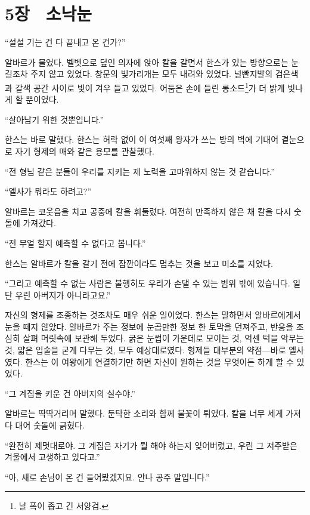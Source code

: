 

\chapter[5장  소낙눈][5장\hspace*{.5em}소낙눈]{5장 \ 소낙눈}



\forceindent``설설 기는 건 다 끝내고 온 건가?''

알바르가 물었다. 벨벳으로 덮인 의자에 앉아 칼을 갈면서 한스가 있는 방향으로는 눈길조차 주지 않고 있었다. 창문의 빛가리개는 모두 내려와 있었다. 널빤지발의 검은색과 갈색 공간 사이로 빛이 겨우 들고 있었다. 어둠은 손에 들린 롱소드\footnote{날 폭이 좁고 긴 서양검.}가 더 밝게 빛나게 할 뿐이었다.

``살아남기 위한 것뿐입니다.''

한스는 바로 말했다. 한스는 허락 없이 이 여섯째 왕자가 쓰는 방의 벽에 기대어 곁눈으로 자기 형제의 매와 같은 용모를 관찰했다.

``전 형님 같은 분들이 우리를 지키는 제 노력을 고마워하지 않는 것 같습니다.''

``엘사가 뭐라도 하려고?''

알바르는 코웃음을 치고 공중에 칼을 휘둘렀다. 여전히 만족하지 않은 채 칼을 다시 숫돌에 가져갔다.

``전 무얼 할지 예측할 수 없다고 봅니다.''

한스는 알바르가 칼을 갈기 전에 잠깐이라도 멈추는 것을 보고 미소를 지었다.

``그리고 예측할 수 없는 사람은 불행히도 우리가 손댈 수 있는 범위 밖에 있습니다. 일단 우린 아버지가 아니라고요.''

자신의 형제를 조종하는 것조차도 매우 쉬운 일이었다. 한스는 말하면서 알바르에게서 눈을 떼지 않았다. 알바르가 주는 정보에 눈곱만한 정보 한 토막을 던져주고, 반응을 조심히 살펴 머릿속에 보관해 두었다. 굵은 눈썹이 가운데로 모이는 것, 억센 턱을 악무는 것, 얇은 입술을 굳게 다무는 것, 모두 예상대로였다. 형제들 대부분의 약점—바로 엘사였다. 한스는 이 여왕에게 연결하기만 하면 자신이 원하는 것을 무엇이든 하게 할 수 있었다.

``그 계집을 키운 건 아버지의 실수야.''

알바르는 딱딱거리며 말했다. 둔탁한 소리와 함께 불꽃이 튀었다. 칼을 너무 세게 가져다 대어 숫돌에 긁혔다.

``완전히 제멋대로야. 그 계집은 자기가 뭘 해야 하는지 잊어버렸고, 우린 그 저주받은 겨울에서 고생하고 있다고.''

``아, 새로 손님이 온 건 들어봤겠지요. 안나 공주 말입니다.''

